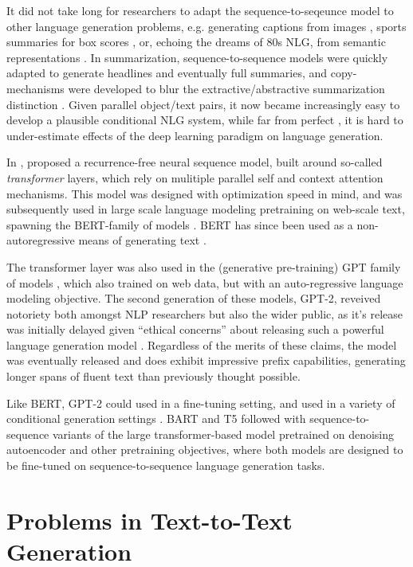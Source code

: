 It did not take long for researchers to adapt the sequence-to-seqeunce model
to other language generation problems, e.g. generating captions from images \cite{},
sports summaries for box scores \cite{}, or, echoing the dreams of 80s NLG, 
from semantic representations \cite{}. In summarization, sequence-to-sequence
models were quickly adapted to generate headlines and eventually full summaries\cite{}, and copy-mechanisms were developed to blur the extractive/abstractive
summarization distinction \citep{}. Given parallel object/text pairs,
it now became increasingly easy to develop a plausible conditional NLG system,
while far from perfect \cite{}, it is hard to under-estimate effects
of the deep learning paradigm on language generation.

In \citeyear{vaswani2017attention}, \citeauthor{vaswani2017attention}
proposed a recurrence-free neural sequence model, built around so-called 
\textit{transformer} layers,
which rely on mulitiple parallel self and context attention mechanisms.
This model was designed with optimization speed in mind, and was subsequently
used in large scale language modeling pretraining on web-scale text, 
spawning the BERT-family
of models \citep{}. BERT has since been used as a non-autoregressive means
of generating text \citep{}. 

The transformer layer was also used in the (generative pre-training) GPT
family of models \citep{}, which also trained on web data, but with an
auto-regressive language modeling objective. The second generation of 
these models, GPT-2, reveived notoriety both amongst NLP researchers but 
also the wider public, as it's release was initially delayed given ``ethical
concerns'' about releasing such a powerful language generation model \citep{}.
Regardless of the merits of these claims, the model was eventually released
and does exhibit impressive prefix capabilities, generating longer spans
of fluent text than previously thought possible. 

Like BERT, GPT-2 could used in a fine-tuning setting, and used in a 
variety of conditional generation settings \citep{}. BART \citep{bart} and
T5 \cite{t5} followed with sequence-to-sequence variants of the 
large transformer-based model pretrained on denoising autoencoder and 
other pretraining objectives, where both models are designed to be fine-tuned
on sequence-to-sequence language generation tasks. 


\section{Problems in Text-to-Text Generation}

